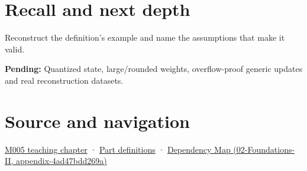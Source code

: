 \section{Recall and next depth}\label{appendix-260182e617b7-recall-and-next-depth}

Reconstruct the definition's example and name the assumptions that make it valid.

\textbf{Pending:} Quantized state, large/rounded weights, overflow-proof generic updates and real reconstruction datasets.

\section{Source and navigation}\label{appendix-260182e617b7-source-and-navigation}

\href{Continuous\%20Notes/Computing\%20Foundations\%20-\%20From\%20Bits\%20to\%20C++\%20and\%20Systems\%20APIs\#When\%20arithmetic\%20meets\%20uncertainty}{M005 teaching chapter} · \hyperref[appendix-fd090d982a15-m005---parts-77-88]{Part definitions} · \href{../02-Foundations-II/main.pdf\#nameddest=appendix-4ad47bdd269a}{Dependency Map (02-Foundations-II, appendix-4ad47bdd269a)}
